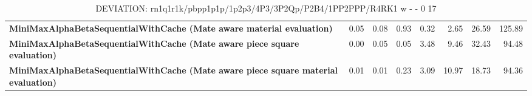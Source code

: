 \begin{table}[H]
{\begin{tabular}{|p{8cm}|*{7}{r|}}
            \rowcolor[HTML]{EFEFEF}
            \textbf{MiniMaxAlphaBetaSequentialWithCache (Mate aware material evaluation)}              & 0.05 & 0.08 & 0.93 & 0.32 & 2.65 & 26.59 & 125.89 \\
            \rowcolor[HTML]{FFFFFF}
            \textbf{MiniMaxAlphaBetaSequentialWithCache (Mate aware piece square evaluation)}               & 0.00 & 0.05 & 0.05 & 3.48 & 9.46 & 32.43 & 94.48 \\
            \rowcolor[HTML]{EFEFEF}
            \textbf{MiniMaxAlphaBetaSequentialWithCache (Mate aware piece square material evaluation)}               & 0.01 & 0.01 & 0.23 & 3.09 & 10.97 & 18.73 & 94.36 \\

            \hline
        \end{tabular}%
    }
    \caption{DEVIATION: rn1q1r1k/pbpp1p1p/1p2p3/4P3/3P2Qp/P2B4/1PP2PPP/R4RK1 w - - 0 17}
    \label{tab:mid-game---en-passant---long-deviation}
\end{table}
